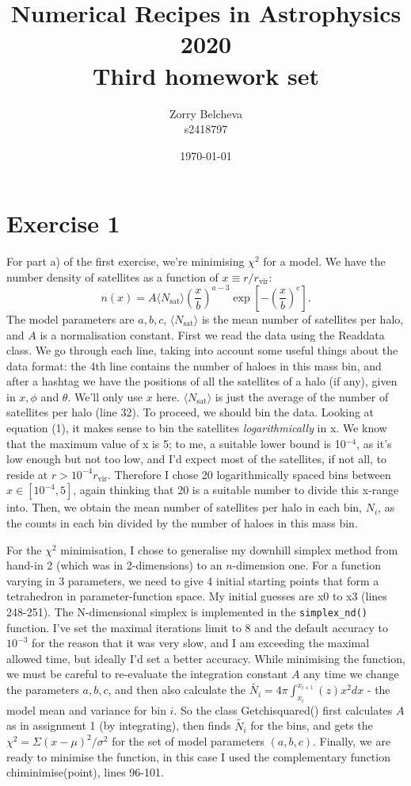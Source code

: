 \documentclass{article}
\title{Numerical Recipes in Astrophysics 2020 \\ Third homework set}
\author{Zorry Belcheva \\ s2418797}
\date{\today}
\begin{document}
\maketitle

\section{Exercise 1}
For part a) of the first exercise, we're minimising $\chi^2$ for a model. We have the number density of satellites as a function of $x \equiv r/r_\mathrm{vir}$:
\begin{equation}
    n(x) = A\langle N_\mathrm{sat}\rangle \left(\frac{x}{b}\right)^{a-3}\exp\left[-\left(\frac{x}{b}\right)^c\right].
\end{equation}
The model parameters are $a, b, c$, $\langle N_\mathrm{sat}\rangle$ is the mean number of satellites per halo, and $A$ is a normalisation constant. First we read the data using the Read\textunderscore data class. We go through each line, taking into account some useful things about the data format: the 4th line contains the number of haloes in this mass bin, and after a hashtag we have the positions of all the satellites of a halo (if any), given in $x, \phi$ and $\theta$. We'll only use $x$ here. $\langle N_\mathrm{sat}\rangle$ is just the average of the number of satellites per halo (line 32). To proceed, we should bin the data. Looking at equation (1), it makes sense to bin the satellites \emph{logarithmically} in x. We know that the maximum value of x is 5; to me, a suitable lower bound is 10$^{-4}$, as it's low enough but not too low, and I'd expect most of the satellites, if not all, to reside at $r>10^{-4}r_\mathrm{vir}$. Therefore I chose 20 logarithmically spaced bins between $x \in [10^{-4}, 5]$, again thinking that 20 is a suitable number to divide this x-range into. Then, we obtain the mean number of satellites per halo in each bin, $N_i$, as the counts in each bin divided by the number of haloes in this mass bin.

For the $\chi^2$ minimisation, I chose to generalise my downhill simplex method from hand-in 2 (which was in 2-dimensions) to an $n$-dimension one. For a function varying in 3 parameters, we need to give 4 initial starting points that form a tetrahedron in parameter-function space. My initial guesses are x0 to x3 (lines 248-251). The N-dimensional simplex is implemented in the \verb+simplex_nd()+ function. I've set the maximal iterations limit to 8 and the default accuracy to $10^{-3}$ for the reason that it was very slow, and I am exceeding the maximal allowed time, but ideally I'd set a better accuracy. While minimising the function, we must be careful to re-evaluate the integration constant $A$ any time we change the parameters $a, b, c$, and then also calculate the $\tilde{N_i} = 4\pi \int_{x_i}^{x_{i+1}}(z)x^2 dx$ - the model mean and variance for bin $i$. So the class Get\textunderscore chi\textunderscore squared() first calculates $A$ as in assignment 1 (by integrating), then finds $\tilde{N_i}$ for the bins, and gets the $\chi^2 = \Sigma (x-\mu)^2/\sigma^2$ for the set of model parameters $(a, b, c)$. Finally, we are ready to minimise the function, in this case I used the complementary function chi\textunderscore minimise(point), lines 96-101.
\end{document}
